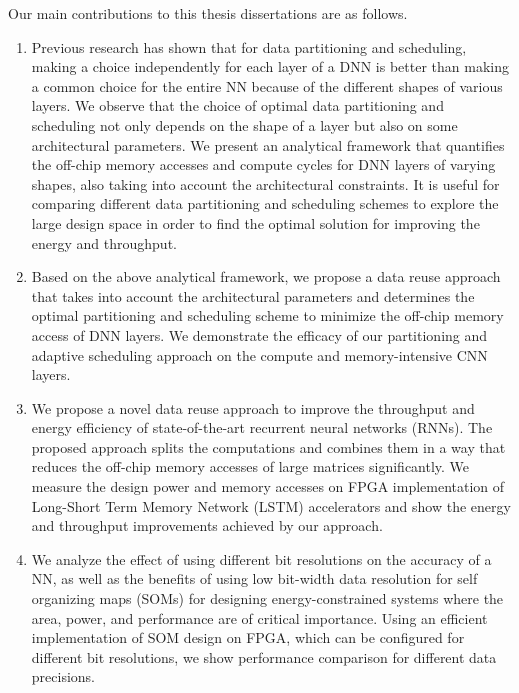 \documentclass[a4paper,10pt]{article}
\begin{document}
Our main contributions to this thesis dissertations are as follows.
\begin{enumerate}
	\item Previous research has shown that for data partitioning and scheduling, making a choice independently for each layer of a DNN is better than making a common choice for the entire NN because of the different shapes of various layers. We observe that the choice of optimal data partitioning and scheduling not only depends on the shape of a layer but also on some architectural parameters. We present an analytical framework that quantifies the off-chip memory accesses and compute cycles for DNN layers of varying shapes, also taking into account the architectural constraints. It is useful for comparing different data partitioning and scheduling schemes to explore the large design space in order to find the optimal solution for improving the energy and throughput. 
   \item Based on the above analytical framework, we propose a data reuse approach that takes into account the architectural parameters and determines the optimal partitioning and scheduling scheme to minimize the off-chip memory access of DNN layers. We demonstrate the efficacy of our partitioning and adaptive scheduling approach on the compute and memory-intensive CNN layers. 
   \item We propose a novel data reuse approach to improve the throughput and energy efficiency of state-of-the-art recurrent neural networks (RNNs). The proposed approach splits the computations and combines them in a way that reduces the off-chip memory accesses of large matrices significantly. We measure the design power and memory accesses on FPGA implementation of Long-Short Term Memory Network (LSTM) accelerators and show the energy and throughput improvements achieved by our approach.
   \item We analyze the effect of using different bit resolutions on the accuracy of a NN, as well as the benefits of using low bit-width data resolution for self organizing maps (SOMs) for designing energy-constrained systems where the area, power, and performance are of critical importance. Using an efficient implementation of SOM design on FPGA, which can be configured for different bit resolutions, we show performance comparison for different data precisions. 
\end{enumerate}
\end{document}
